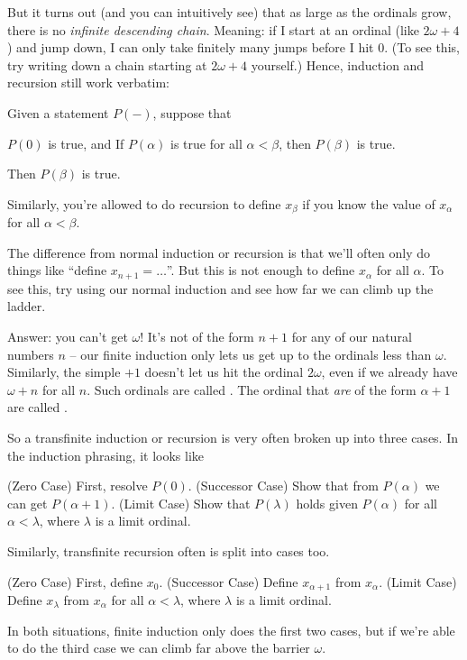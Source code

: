 But it turns out (and you can intuitively see) that as large as the ordinals grow,
there is no \emph{infinite descending chain}.
Meaning: if I start at an ordinal (like $2 \omega + 4$) and jump down, I can only
take finitely many jumps before I hit $0$.
(To see this, try writing down a chain starting at $2 \omega + 4$ yourself.)
Hence, induction and recursion still work verbatim:
\begin{theorem}
	Given a statement $P(-)$, suppose that
	\begin{itemize}
		\ii $P(0)$ is true, and
		\ii If $P(\alpha)$ is true for all $\alpha < \beta$, then $P(\beta)$ is true.
	\end{itemize}
	Then $P(\beta)$ is true.
\end{theorem}
Similarly, you're allowed to do recursion to define $x_\beta$ if you know the
value of $x_\alpha$ for all $\alpha < \beta$.

The difference from normal induction or recursion is that we'll often
only do things like ``define $x_{n+1} = \dots$''.
But this is not enough to define $x_\alpha$ for all $\alpha$.
To see this, try using our normal induction and see how far we can climb up the ladder.

Answer: you can't get $\omega$!
It's not of the form $n+1$ for any of our natural numbers $n$ -- our finite induction only lets us
get up to the ordinals less than $\omega$.
Similarly, the simple $+1$ doesn't let us hit the ordinal $2\omega$,
even if we already have $\omega+n$ for all $n$.
Such ordinals are called .
The ordinal that \emph{are} of the form $\alpha+1$ are called .

So a transfinite induction or recursion is very often broken up into three cases.
In the induction phrasing, it looks like
\begin{itemize}
	\ii (Zero Case) First, resolve $P(0)$.
	\ii (Successor Case) Show that from $P(\alpha)$ we can get $P(\alpha+1)$.
	\ii (Limit Case) Show that $P(\lambda)$ holds given $P(\alpha)$ for all $\alpha < \lambda$,
	where $\lambda$ is a limit ordinal.
\end{itemize}
Similarly, transfinite recursion often is split into cases too.
\begin{itemize}
	\ii (Zero Case) First, define $x_0$.
	\ii (Successor Case) Define $x_{\alpha+1}$ from $x_\alpha$.
	\ii (Limit Case) Define $x_\lambda$ from $x_\alpha$ for all $\alpha < \lambda$,
	where $\lambda$ is a limit ordinal.
\end{itemize}
In both situations, finite induction only does the first two cases,
but if we're able to do the third case we can climb far above the barrier $\omega$.

